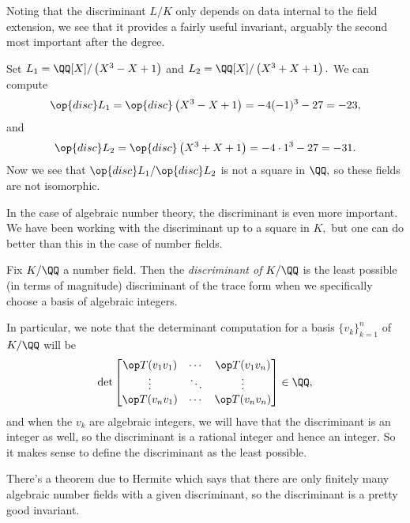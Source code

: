 Noting that the discriminant $L/K$ only depends on data internal to the field extension, we see that it provides a fairly useful invariant, arguably the second most important after the degree.
\begin{example}
	Set $L_1=\QQ[X]/\left(X^3-X+1\right)$ and $L_2=\QQ[X]/\left(X^3+X+1\right).$ We can compute
	\[\op{disc}L_1=\op{disc}\left(X^3-X+1\right)=-4(-1)^3-27=-23,\]
	and
	\[\op{disc}L_2=\op{disc}\left(X^3+X+1\right)=-4\cdot1^3-27=-31.\]
	Now we see that $\op{disc}L_1/\op{disc}L_2$ is not a square in $\QQ,$ so these fields are not isomorphic.
\end{example}
In the case of algebraic number theory, the discriminant is even more important. We have been working with the discriminant up to a square in $K,$ but one can do better than this in the case of number fields.
\begin{definition}
	Fix $K/\QQ$ a number field. Then the \textit{discriminant of $K/\QQ$} is the least possible (in terms of magnitude) discriminant of the trace form when we specifically choose a basis of algebraic integers.
\end{definition}
In particular, we note that the determinant computation for a basis $\{v_k\}_{k=1}^n$ of $K/\QQ$ will be
\[\det\begin{bmatrix}
	\op T(v_1v_1) & \cdots & \op T(v_1v_n) \\
	\vdots & \ddots & \vdots \\
	\op T(v_nv_1) & \cdots & \op T(v_nv_n)
\end{bmatrix}\in\QQ,\]
and when the $v_k$ are algebraic integers, we will have that the discriminant is an integer as well, so the discriminant is a rational integer and hence an integer. So it makes sense to define the discriminant as the least possible.
\begin{remark}
	There's a theorem due to Hermite which says that there are only finitely many algebraic number fields with a given discriminant, so the discriminant is a pretty good invariant.
\end{remark}


